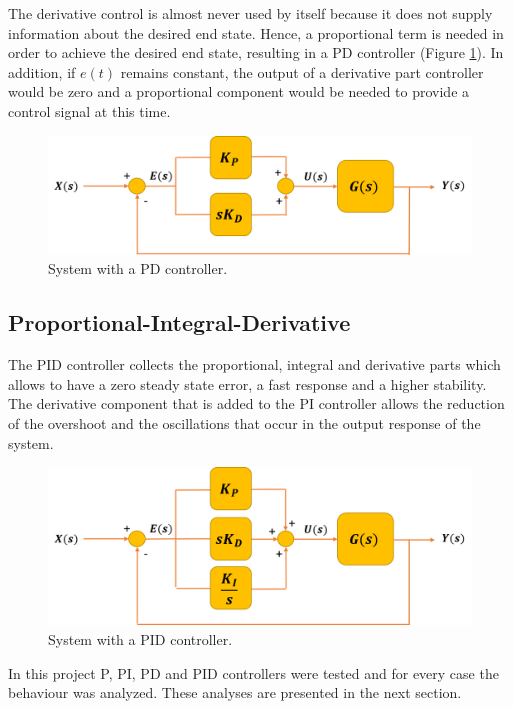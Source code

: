 The derivative control is almost never used by itself because it does not supply information about the desired end state. Hence, a proportional term is needed in order to achieve the desired end state, resulting in a PD controller (Figure \ref{PD_controller}). In addition, if $e(t)$ remains constant, the output of a derivative part controller would be zero and a proportional component would be needed to provide a control signal at this time. 

\begin{figure}[H]
	\centering
	\includegraphics[scale=0.6]{figures/PD_controller.png}
	\caption{System with a PD controller.}
	\label{PD_controller}
\end{figure}

\subsection*{Proportional-Integral-Derivative}

The PID controller collects the proportional, integral and derivative parts which allows to have a zero steady state error, a fast response and a higher stability. The derivative component that is added to the PI controller allows the reduction of the overshoot and the oscillations that occur in the output response of the system. 

\begin{figure}[H]
	\centering
	\includegraphics[scale=0.6]{figures/PID_controller.png}
	\caption{System with a PID controller.}
	\label{PID_controller}
\end{figure}

In this project P, PI, PD and PID controllers were tested and for every case the behaviour was analyzed. These analyses are presented in the next section.